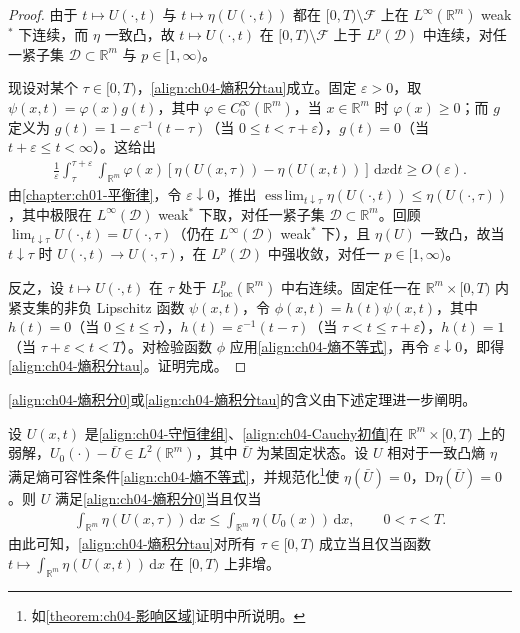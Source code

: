 \documentclass[../../main.tex]{subfiles}
\begin{document}
\begin{proof}
由于 $t\mapsto U(\cdot,t)$ 与 $t\mapsto\eta(U(\cdot,t))$ 都在 $[0,T)\setminus\mathscr{F}$ 上在 $L^{\infty}(\mathbb{R}^{m})$ weak$^{*}$ 下连续，而 $\eta$ 一致凸，故 $t\mapsto U(\cdot,t)$ 在 $[0,T)\setminus\mathscr{F}$ 上于 $L^{p}(\mathscr{D})$ 中连续，对任一紧子集 $\mathscr{D}\subset\mathbb{R}^{m}$ 与 $p\in[1,\infty)$。

现设对某个 $\tau\in[0,T)$，\eqref{align:ch04-熵积分tau}成立。固定 $\varepsilon>0$，取 $\psi(x,t)=\varphi(x)g(t)$，其中 $\varphi\in C_{0}^{\infty}(\mathbb{R}^{m})$，当 $x\in\mathbb{R}^{m}$ 时 $\varphi(x)\geqslant 0$；而 $g$ 定义为 $g(t)=1-\varepsilon^{-1}(t-\tau)$（当 $0\leqslant t<\tau+\varepsilon$），$g(t)=0$（当 $t+\varepsilon\leqslant t<\infty$）。这给出
\begin{align}
\frac{1}{\varepsilon}\int_{\tau}^{\tau+\varepsilon}\int_{\mathbb{R}^{m}}\varphi(x)[\eta(U(x,\tau))-\eta(U(x,t))]\,\mathrm{d}x\mathrm{d}t\geqslant O(\varepsilon).
\label{align:ch04-熵均值}
\end{align}
由\cref{chapter:ch01-平衡律}，令 $\varepsilon\downarrow 0$，推出 $\operatorname*{ess\,lim}_{t\downarrow\tau}\eta(U(\cdot,t))\leqslant\eta(U(\cdot,\tau))$，其中极限在 $L^{\infty}(\mathscr{D})$ weak$^{*}$ 下取，对任一紧子集 $\mathscr{D}\subset\mathbb{R}^{m}$。回顾 $\operatorname*{lim}_{t\downarrow\tau}U(\cdot,t)=U(\cdot,\tau)$（仍在 $L^{\infty}(\mathscr{D})$ weak$^{*}$ 下），且 $\eta(U)$ 一致凸，故当 $t\downarrow\tau$ 时 $U(\cdot,t)\to U(\cdot,\tau)$，在 $L^{p}(\mathscr{D})$ 中强收敛，对任一 $p\in[1,\infty)$。


反之，设 $t\mapsto U(\cdot,t)$ 在 $\tau$ 处于 $L_{\mathrm{loc}}^{p}(\mathbb{R}^{m})$ 中右连续。固定任一在 $\mathbb{R}^{m}\times[0,T)$ 内紧支集的非负 Lipschitz 函数 $\psi(x,t)$，令 $\phi(x,t)=h(t)\psi(x,t)$，其中 $h(t)=0$（当 $0\leqslant t\leqslant\tau$），$h(t)=\varepsilon^{-1}(t-\tau)$（当 $\tau<t\leqslant\tau+\varepsilon$），$h(t)=1$（当 $\tau+\varepsilon<t<T$）。对检验函数 $\phi$ 应用\eqref{align:ch04-熵不等式}，再令 $\varepsilon\downarrow 0$，即得\eqref{align:ch04-熵积分tau}。证明完成。
\end{proof}

\eqref{align:ch04-熵积分0}或\eqref{align:ch04-熵积分tau}的含义由下述定理进一步阐明。

\begin{theorem}\label{theorem:ch04-总熵衰减}
设 $U(x,t)$ 是\eqref{align:ch04-守恒律组}、\eqref{align:ch04-Cauchy初值}在 $\mathbb{R}^{m}\times[0,T)$ 上的弱解，$U_{0}(\cdot)-\bar{U}\in L^{2}(\mathbb{R}^{m})$，其中 $\bar{U}$ 为某固定状态。设 $U$ 相对于一致凸熵 $\eta$ 满足熵可容性条件\eqref{align:ch04-熵不等式}，并规范化\footnote{如\cref{theorem:ch04-影响区域}证明中所说明。}使 $\eta(\bar{U})=0$，$\mathrm{D}\eta(\bar{U})=0$。则 $U$ 满足\eqref{align:ch04-熵积分0}当且仅当
\begin{align}
\int_{\mathbb{R}^{m}}\eta(U(x,\tau))\,\mathrm{d}x\leqslant\int_{\mathbb{R}^{m}}\eta(U_{0}(x))\,\mathrm{d}x,\qquad 0<\tau<T.
\label{align:ch04-总熵衰减式}
\end{align}
由此可知，\eqref{align:ch04-熵积分tau}对所有 $\tau\in[0,T)$ 成立当且仅当函数 $t\mapsto\int_{\mathbb{R}^{m}}\eta(U(x,t))\,\mathrm{d}x$ 在 $[0,T)$ 上非增。
\end{theorem}
\end{document}
